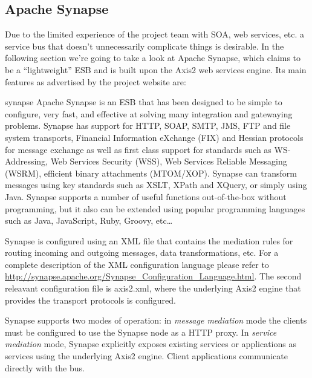 \subsection{Apache Synapse}
\label{sec:apache-synapse}

Due to the limited experience of the project team with SOA, web services, etc.
a service bus that doesn't unnecessarily complicate things is desirable. In
the following section we're going to take a look at Apache Synapse, which
claims to be a ``lightweight'' ESB and is built upon the Axis2 web services
engine. Its main features as advertised by the project website are:

\begin{mycite}{synapse}
Apache Synapse is an ESB that has been designed to be simple to configure, very
fast, and effective at solving many integration and gatewaying problems. Synapse
has support for HTTP, SOAP, SMTP, JMS, FTP and file system transports, Financial
Information eXchange (FIX) and Hessian protocols for message exchange as well as
first class support for standards such as WS-Addressing, Web Services Security
(WSS), Web Services Reliable Messaging (WSRM), efficient binary attachments
(MTOM/XOP). Synapse can transform messages using key standards such as XSLT,
XPath and XQuery, or simply using Java. Synapse supports a number of useful
functions out-of-the-box without programming, but it also can be extended using
popular programming languages such as Java, JavaScript, Ruby, Groovy, etc\ldots
\end{mycite}

Synapse is configured using an XML file that contains the mediation rules for
routing incoming and outgoing messages, data transformations, etc. For a
complete description of the XML configuration language please refer to 
\url{http://synapse.apache.org/Synapse_Configuration_Language.html}. The second
releavant configuration file is axis2.xml, where the underlying Axis2 engine
that provides the transport protocols is configured.


Synapse supports two modes of operation: in \emph{message mediation} mode
the clients must be configured to use the Synapse node as a HTTP proxy.
In \emph{service mediation} mode, Synapse explicitly exposes existing services
or applications as services using the underlying Axis2 engine. Client
applications communicate directly with the bus.

